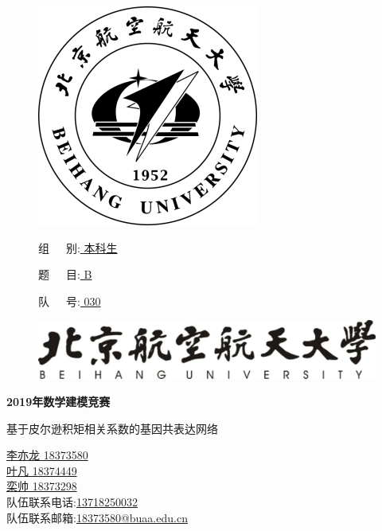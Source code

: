 \documentclass[zihao=-4]{ctexart}
\begin{document}
\lhead{}%
\rhead{}%
\begin{figure}
    \begin{minipage}{0.6\linewidth}
        \includegraphics{pic/xiaohui.png}
    \end{minipage}
    \hfill
    \begin{minipage}{0.3\linewidth}
        组\ \ \ 别:\underline{ 本科生 }
        
        题\ \ \ 目:\underline{ B }

        队\ \ \ 号:\underline{ 030 }
    \end{minipage}
\end{figure}
\vbox{}
\begin{figure}[H]
    \centering
    \includegraphics{pic/xiaoming.png}
\end{figure}
\vbox{}
\centerline{\textbf{\Huge{2019年数学建模竞赛}}}
\vbox{}
\begin{center}
    \LARGE 基于皮尔逊积矩相关系数的基因共表达网络
\end{center}
\vbox{}
\vbox{}
\begin{center}
    \large
    \underline{李亦龙 18373580}\\
    \underline{叶凡 18374449}\\
    \underline{栾帅 18373298}\\
    队伍联系电话:\underline{13718250032}\\
    队伍联系邮箱:\underline{18373580@buaa.edu.cn}
\end{center}
\end{document}
